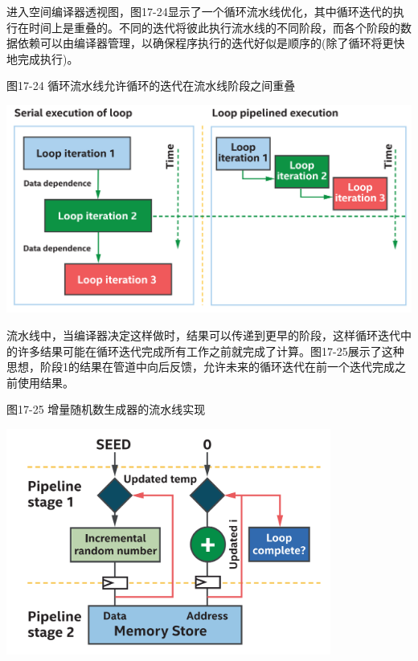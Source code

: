 进入空间编译器透视图，图17-24显示了一个循环流水线优化，其中循环迭代的执行在时间上是重叠的。不同的迭代将彼此执行流水线的不同阶段，而各个阶段的数据依赖可以由编译器管理，以确保程序执行的迭代好似是顺序的(除了循环将更快地完成执行)。\par

\hspace*{\fill} \par %
图17-24 循环流水线允许循环的迭代在流水线阶段之间重叠
\begin{center}
	\includegraphics[width=1.0\textwidth]{content/chapter-17/images/19}
\end{center}

流水线中，当编译器决定这样做时，结果可以传递到更早的阶段，这样循环迭代中的许多结果可能在循环迭代完成所有工作之前就完成了计算。图17-25展示了这种思想，阶段1的结果在管道中向后反馈，允许未来的循环迭代在前一个迭代完成之前使用结果。\par

\hspace*{\fill} \par %
图17-25 增量随机数生成器的流水线实现
\begin{center}
	\includegraphics[width=0.8\textwidth]{content/chapter-17/images/20}
\end{center}

